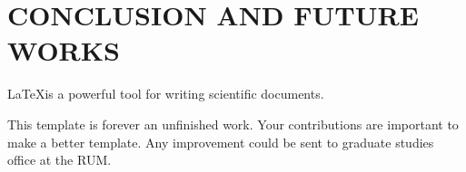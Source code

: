 \chapter{CONCLUSION AND FUTURE WORKS}


\LaTeX is a powerful tool for writing scientific documents.

This template is forever an unfinished work. Your contributions are important to make a better template. Any improvement could be sent to graduate studies office at the RUM.
